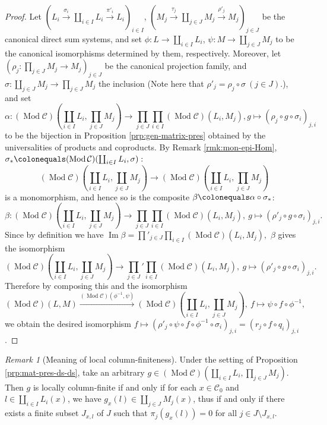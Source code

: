 \documentclass{surv-l}
\makeatletter
\DeclareRobustCommand{\forcelinebreak}{%
    \@ifstar{\unskip\\\ignorespaces}{\unskip\linebreak}%
}
\numberwithin{equation}{chapter}
\numberwithin{figure}{chapter}
\theoremstyle{plain}
\theoremstyle{definition}
\theoremstyle{remark}
\newtheorem{rmk}[thm]{Remark}
\DeclareMathOperator{\Mod}{Mod}
\makeatother
\begin{document}
\begin{proof}
Let $(L_i \xrightarrow{\sigma_i} \coprod_{i\in I}L_i \xrightarrow{\pi'_i} L_i)_{i\in I}$,
$(M_j \xrightarrow{\tau_j} \coprod_{j\in J}M_j \xrightarrow{\rho'_j} M_j)_{j\in J}$
be the canonical direct sum systems, and
set $\phi \colon L \to \coprod_{i\in I}L_i$,
$\psi \colon M \to \coprod_{j\in J}M_j$ to be the
canonical isomorphisms determined by them, respectively.
Moreover, let
$(\rho_j\colon \prod_{j\in J}M_j \to M_j)_{j\in J}$ be the canonical projection family,
and
$\sigma \colon\coprod_{j\in J}M_j \to \prod_{j\in J}M_j$ the inclusion
(Note here that $\rho'_j = \rho_j \circ \sigma\ (j\in J)$.), and set
\begin{equation*}
\alpha \colon
(\Mod{\mathcal{C}})(\coprod_{i\in I} L_i, \prod_{j\in J}M_j)
\to \prod_{j\in J}\prod_{i\in I} (\Mod{\mathcal{C}})(L_i, M_j), g \mapsto (\rho_j \circ g \circ \sigma_i)_{j,i}
\end{equation*}
to be the bijection in Proposition \ref{prp:gen-matrix-pres} obtained by
the universalities of products and coproducts.
By Remark \ref{rmk:mon-epi-Hom},
$\sigma_*\colonequals (\Mod {\mathcal{C}})(\coprod_{i\in I}L_i, \sigma):$
\[
(\Mod {\mathcal{C}})(\coprod_{i\in I}L_i, \coprod_{j\in J}M_j) \to
(\Mod {\mathcal{C}})(\coprod_{i\in I}L_i, \prod_{j\in J}M_j)
\]
is a monomorphism, and hence so is the composite $\beta\colonequals \alpha \circ \sigma_*$:
\[
\beta\colon
(\Mod {\mathcal{C}})(\coprod_{i\in I}L_i, \coprod_{j\in J}M_j) \to
\prod_{j\in J}\prod_{i\in I} (\Mod{\mathcal{C}})(L_i, M_j),\ g \mapsto (\rho'_j\circ g \circ \sigma_i)_{j,i}.
\]
Since by definition we have
$
\operatorname{Im} \beta =
{\prod'_{j\in J}}\prod_{i\in I}(\Mod{\mathcal{C}})(L_i, M_j),
$
$\beta$ gives the isomorphism
\[
(\Mod{\mathcal{C}})(\coprod_{i\in I}L_i, \coprod_{j\in J}M_j) \to
{\prod_{j\in J}}'\prod_{i\in I}(\Mod{\mathcal{C}})(L_i, M_j),\
g \mapsto (\rho'_j\circ g \circ \sigma_i)_{j,i}.
\]
Therefore by composing this and the isomorphism
\[
(\Mod{\mathcal{C}})(L, M) \xrightarrow{(\Mod{\mathcal{C}})(\phi^{-1}, \psi)} (\Mod{\mathcal{C}})(\coprod_{i\in I}L_i, \coprod_{j\in J}M_j)
,\ f \mapsto \psi \circ f \circ \phi^{-1},
\]
we obtain the desired isomorphism
$f \mapsto  (\rho'_j\circ \psi \circ f \circ \phi^{-1} \circ \sigma_i)_{j,i} = (r_j \circ f \circ q_i)_{j,i}$.
\end{proof}

\begin{rmk}[Meaning of local column-finiteness]
Under the setting of\forcelinebreak{} Proposition \ref{prp:mat-pres-ds-ds},
take an arbitrary $g \in (\Mod{\mathcal{C}})(\coprod_{i\in I} L_i, \prod_{j\in J}M_j)$.
Then $g$ is locally column-finite if and only if
for each $x \in {\mathcal{C}}_0$ and $l \in \coprod_{i\in I}L_i(x)$,
we have $g_x(l) \in \coprod_{j\in J}M_j(x)$,
thus if and only if
there exists a finite subset $J_{x,l}$ of $J$ such that $\pi_j(g_x(l)) = 0$
for all $j \in J \setminus J_{x,l}$.
\end{rmk}
\end{document}
